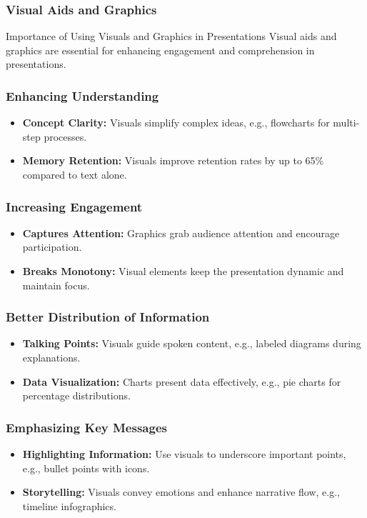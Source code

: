 \documentclass[aspectratio=169]{beamer}
\begin{document}
\begin{frame}[fragile]
    \frametitle{Visual Aids and Graphics}
    \begin{block}{Importance of Using Visuals and Graphics in Presentations}
        Visual aids and graphics are essential for enhancing engagement and comprehension in presentations. 
    \end{block}
\end{frame}

\begin{frame}[fragile]
    \frametitle{Enhancing Understanding}
    \begin{itemize}
        \item \textbf{Concept Clarity:} Visuals simplify complex ideas, e.g., flowcharts for multi-step processes.
        \item \textbf{Memory Retention:} Visuals improve retention rates by up to 65\% compared to text alone.
    \end{itemize}
\end{frame}

\begin{frame}[fragile]
    \frametitle{Increasing Engagement}
    \begin{itemize}
        \item \textbf{Captures Attention:} Graphics grab audience attention and encourage participation.
        \item \textbf{Breaks Monotony:} Visual elements keep the presentation dynamic and maintain focus.
    \end{itemize}
\end{frame}

\begin{frame}[fragile]
    \frametitle{Better Distribution of Information}
    \begin{itemize}
        \item \textbf{Talking Points:} Visuals guide spoken content, e.g., labeled diagrams during explanations.
        \item \textbf{Data Visualization:} Charts present data effectively, e.g., pie charts for percentage distributions.
    \end{itemize}
\end{frame}

\begin{frame}[fragile]
    \frametitle{Emphasizing Key Messages}
    \begin{itemize}
        \item \textbf{Highlighting Information:} Use visuals to underscore important points, e.g., bullet points with icons.
        \item \textbf{Storytelling:} Visuals convey emotions and enhance narrative flow, e.g., timeline infographics.
    \end{itemize}
\end{frame}
\end{document}
